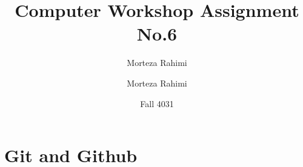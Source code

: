 \documentclass[30px]{article}
\title{{\tfont Computer Workshop Assignment No.6}}
\author{Morteza Rahimi}
\affil{Iran University of Science and Technology}
\date{Fall 4031}
\author{Morteza Rahimi}
\begin{document}
\maketitle
\newpage
\tableofcontents
\newpage
\section{Git and Github}
\end{document}
